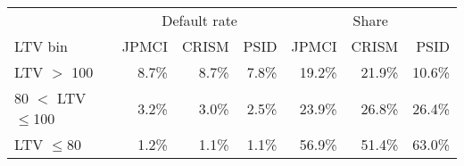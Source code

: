 \begin{tabular}{lrrrrrr}
\hline\hline
 & \multicolumn{3}{c}{Default rate} & \multicolumn{3}{c}{Share} \\ 
\cmidrule(lr){2-4} \cmidrule(lr){5-7}
LTV bin & JPMCI & CRISM & PSID & JPMCI & CRISM & PSID \\ 
\midrule
LTV $>$ 100 & 8.7\% & 8.7\% & 7.8\% & 19.2\% & 21.9\% & 10.6\% \\ 
80 $<$ LTV $\leq$100 & 3.2\% & 3.0\% & 2.5\% & 23.9\% & 26.8\% & 26.4\% \\ 
LTV $\leq$80 & 1.2\% & 1.1\% & 1.1\% & 56.9\% & 51.4\% & 63.0\% \\ 
\bottomrule
\end{tabular}
